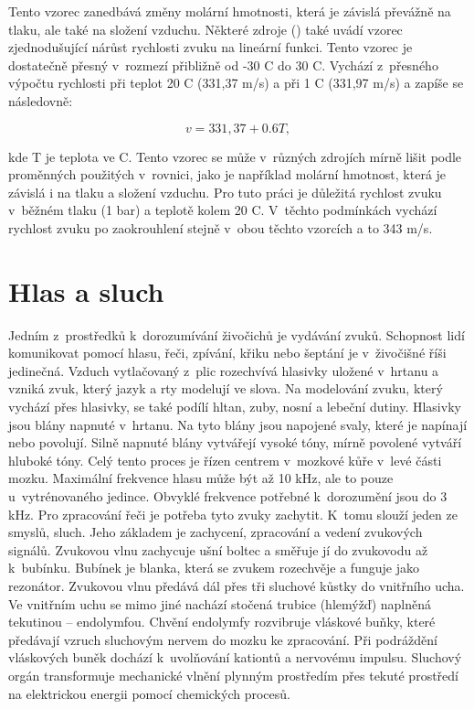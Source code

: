 Tento vzorec zanedbává změny molární hmotnosti, která je závislá převážně na tlaku, ale také na složení vzduchu. Některé zdroje (\cite{rychlost}) také uvádí vzorec zjednodušující nárůst rychlosti zvuku na lineární funkci. Tento vzorec je dostatečně přesný v~rozmezí přibližně od -30 \degree C do 30 \degree C. Vychází z~přesného výpočtu rychlosti při teplot 20 \degree C (331,37 m/s) a při 1 \degree C (331,97 m/s) a zapíše se následovně:

\begin{equation}
	v=331,37 + 0.6 T,
\end{equation}

kde T je teplota ve \degree C. Tento vzorec se může v~různých zdrojích mírně lišit podle proměnných použitých v~rovnici, jako je například molární hmotnost, která je závislá i na tlaku a složení vzduchu. Pro tuto práci je důležitá rychlost zvuku v~běžném tlaku (1 bar) a teplotě kolem 20 \degree C.  V~těchto podmínkách vychází rychlost zvuku po zaokrouhlení stejně v~obou těchto vzorcích a to 343 m/s.%

\section{Hlas a sluch}
\label{hlas a sluch}

Jedním z~prostředků k~dorozumívání živočichů je vydávání zvuků. Schopnost lidí komunikovat pomocí hlasu, řeči, zpívání, křiku nebo šeptání je v~živočišné říši jedinečná. Vzduch vytlačovaný z~plic rozechvívá hlasivky uložené v~hrtanu a vzniká zvuk, který jazyk a rty modelují ve slova. Na modelování zvuku, který vychází přes hlasivky, se také podílí hltan, zuby, nosní a lebeční dutiny. Hlasivky jsou blány napnuté v~hrtanu. Na tyto blány jsou napojené svaly, které je napínají nebo povolují. Silně napnuté blány vytvářejí vysoké tóny, mírně povolené vytváří hluboké tóny. Celý tento proces je řízen centrem v~mozkové kůře v~levé části mozku. Maximální frekvence hlasu může být až 10 kHz, ale to pouze u~vytrénovaného jedince. Obvyklé frekvence potřebné k~dorozumění jsou do 3 kHz.  
Pro zpracování řeči je potřeba tyto zvuky zachytit. K~tomu slouží jeden ze smyslů, sluch. Jeho základem je zachycení, zpracování a vedení zvukových signálů.  Zvukovou vlnu zachycuje ušní boltec a směřuje jí do zvukovodu až k~bubínku. Bubínek je blanka, která se zvukem rozechvěje a funguje jako rezonátor. Zvukovou vlnu předává dál přes tři sluchové kůstky do vnitřního ucha. Ve vnitřním uchu se mimo jiné nachází stočená trubice (hlemýžď) naplněná tekutinou – endolymfou.  Chvění endolymfy rozvibruje vláskové buňky, které předávají vzruch sluchovým nervem do mozku ke zpracování.  Při podráždění vláskových buněk dochází k~uvolňování kationtů a nervovému impulsu. Sluchový orgán transformuje mechanické vlnění plynným prostředím přes tekuté prostředí na elektrickou energii pomocí chemických procesů. \cite{encyklopedie} \cite{hlasasluch}

